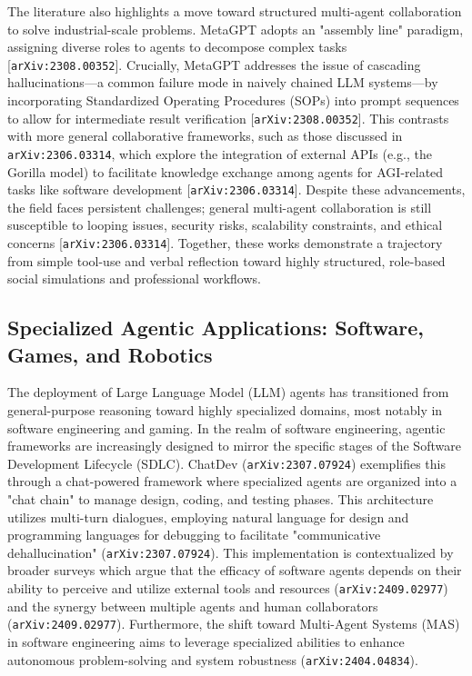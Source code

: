 \documentclass[11pt]{article}
\begin{document}
The literature also highlights a move toward structured multi-agent collaboration to solve industrial-scale problems. MetaGPT adopts an "assembly line" paradigm, assigning diverse roles to agents to decompose complex tasks [\texttt{arXiv:2308.00352}]. Crucially, MetaGPT addresses the issue of cascading hallucinations—a common failure mode in naively chained LLM systems—by incorporating Standardized Operating Procedures (SOPs) into prompt sequences to allow for intermediate result verification [\texttt{arXiv:2308.00352}]. This contrasts with more general collaborative frameworks, such as those discussed in \texttt{arXiv:2306.03314}, which explore the integration of external APIs (e.g., the Gorilla model) to facilitate knowledge exchange among agents for AGI-related tasks like software development [\texttt{arXiv:2306.03314}]. Despite these advancements, the field faces persistent challenges; general multi-agent collaboration is still susceptible to looping issues, security risks, scalability constraints, and ethical concerns [\texttt{arXiv:2306.03314}]. Together, these works demonstrate a trajectory from simple tool-use and verbal reflection toward highly structured, role-based social simulations and professional workflows.

\subsection{Specialized Agentic Applications: Software, Games, and Robotics}

The deployment of Large Language Model (LLM) agents has transitioned from general-purpose reasoning toward highly specialized domains, most notably in software engineering and gaming. In the realm of software engineering, agentic frameworks are increasingly designed to mirror the specific stages of the Software Development Lifecycle (SDLC). ChatDev (\texttt{arXiv:2307.07924}) exemplifies this through a chat-powered framework where specialized agents are organized into a "chat chain" to manage design, coding, and testing phases. This architecture utilizes multi-turn dialogues, employing natural language for design and programming languages for debugging to facilitate "communicative dehallucination" (\texttt{arXiv:2307.07924}). This implementation is contextualized by broader surveys which argue that the efficacy of software agents depends on their ability to perceive and utilize external tools and resources (\texttt{arXiv:2409.02977}) and the synergy between multiple agents and human collaborators (\texttt{arXiv:2409.02977}). Furthermore, the shift toward Multi-Agent Systems (MAS) in software engineering aims to leverage specialized abilities to enhance autonomous problem-solving and system robustness (\texttt{arXiv:2404.04834}).
\end{document}
